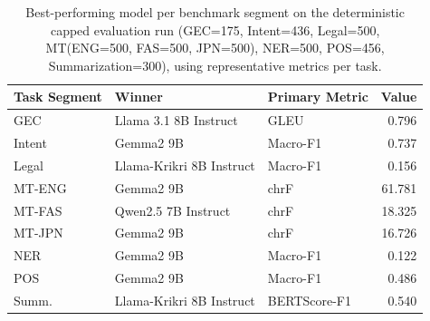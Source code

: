 \begin{table}[t]
\centering
\caption{Best-performing model per benchmark segment on the deterministic capped evaluation run (GEC=175, Intent=436, Legal=500, MT(ENG=500, FAS=500, JPN=500), NER=500, POS=456, Summarization=300), using representative metrics per task.}
\label{tab:capped-task-winners}
\begin{tabular}{lllr}
\toprule
Task Segment & Winner & Primary Metric & Value \\
\midrule
GEC & Llama 3.1 8B Instruct & GLEU & 0.796 \\
Intent & Gemma2 9B & Macro-F1 & 0.737 \\
Legal & Llama-Krikri 8B Instruct & Macro-F1 & 0.156 \\
MT-ENG & Gemma2 9B & chrF & 61.781 \\
MT-FAS & Qwen2.5 7B Instruct & chrF & 18.325 \\
MT-JPN & Gemma2 9B & chrF & 16.726 \\
NER & Gemma2 9B & Macro-F1 & 0.122 \\
POS & Gemma2 9B & Macro-F1 & 0.486 \\
Summ. & Llama-Krikri 8B Instruct & BERTScore-F1 & 0.540 \\
\bottomrule
\end{tabular}
\end{table}
